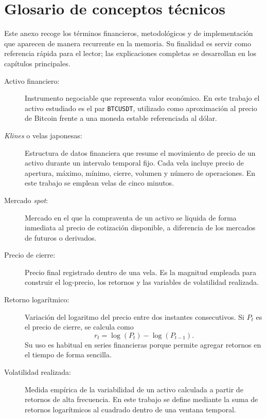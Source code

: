 
\addto\captionsspanish{\renewcommand{\appendixname}{Anexo}}
\appendix
\makeatletter
\gdef\@chapapp{Anexo}
\makeatother
\chapter{Glosario de conceptos técnicos}\label{anexo:glosario}

Este anexo recoge los términos financieros, metodológicos y de implementación que aparecen de manera recurrente en la memoria. Su finalidad es servir como referencia rápida para el lector; las explicaciones completas se desarrollan en los capítulos principales.

\begin{description}
    \item[Activo financiero:] Instrumento negociable que representa valor económico. En este trabajo el activo estudiado es el par \texttt{BTCUSDT}, utilizado como aproximación al precio de Bitcoin frente a una moneda estable referenciada al dólar.

    \item[\textit{Klines} o velas japonesas:] Estructura de datos financiera que resume el movimiento de precio de un activo durante un intervalo temporal fijo. Cada vela incluye precio de apertura, máximo, mínimo, cierre, volumen y número de operaciones. En este trabajo se emplean velas de cinco minutos.

    \item[Mercado \textit{spot}:] Mercado en el que la compraventa de un activo se liquida de forma inmediata al precio de cotización disponible, a diferencia de los mercados de futuros o derivados.

    \item[Precio de cierre:] Precio final registrado dentro de una vela. Es la magnitud empleada para construir el log-precio, los retornos y las variables de volatilidad realizada.

    \item[Retorno logarítmico:] Variación del logaritmo del precio entre dos instantes consecutivos. Si \(P_t\) es el precio de cierre, se calcula como
    \begin{equation}
        r_t = \log(P_t) - \log(P_{t-1}).
    \end{equation}
    Su uso es habitual en series financieras porque permite agregar retornos en el tiempo de forma sencilla.

    \item[Volatilidad realizada:] Medida empírica de la variabilidad de un activo calculada a partir de retornos de alta frecuencia. En este trabajo se define mediante la suma de retornos logarítmicos al cuadrado dentro de una ventana temporal.


\end{description}
